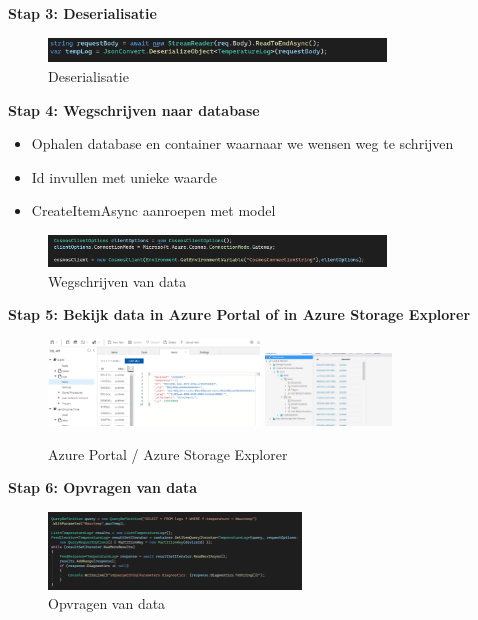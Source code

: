 \documentclass{article}
\newcommand{\bold}[1]{\textbf{#1}}
\begin{document}
\bold{Stap 3: Deserialisatie}

\begin{figure}[H]
    \centering
    \includegraphics[width=0.8\textwidth]{cosmosdb-stap3.png}
    \caption{Deserialisatie}
\end{figure}


\bold{Stap 4: Wegschrijven naar database}

\begin{itemize}
    \item Ophalen database en container waarnaar we wensen weg te schrijven
    \item Id invullen met unieke waarde
    \item CreateItemAsync aanroepen met model
\end{itemize}

\begin{figure}[H]
    \centering
    \includegraphics[width=0.8\textwidth]{cosmosdb-stap1.png}
    \caption{Wegschrijven van data}
\end{figure}


\bold{Stap 5: Bekijk data in Azure Portal of in Azure Storage Explorer}

\begin{figure}[H]
    \centering
    \includegraphics[width=0.5\textwidth]{cosmosdb-stap5-1.png}
    \includegraphics[width=0.3\textwidth]{cosmosdb-stap5-2.png}
    \caption{Azure Portal / Azure Storage Explorer}
\end{figure}

\bold{Stap 6: Opvragen van data}

\begin{figure}[H]
    \centering
    \includegraphics[width=0.6\textwidth]{cosmosdb-stap6.png}
    \caption{Opvragen van data}
\end{figure}
\end{document}
